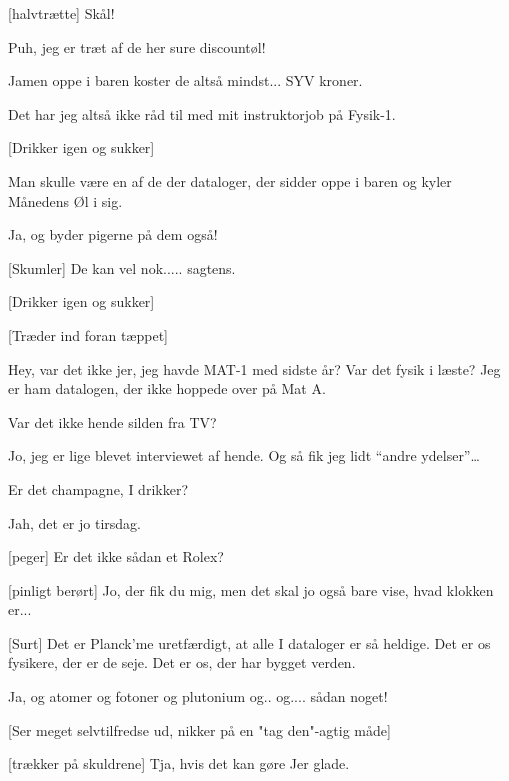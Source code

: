 \documentclass[a4paper,11pt]{article}
\begin{document}
\begin{sketch}
  
   [halvtrætte] Skål! 
  
   Puh, jeg er træt af de her sure discountøl!
  
   Jamen oppe i baren koster de altså mindst... SYV kroner.
  
   Det har jeg altså ikke råd til med mit instruktorjob på
  Fysik-1.
  
   [Drikker igen og sukker]
  
   Man skulle være en af de der dataloger, der sidder oppe i
  baren og kyler Månedens Øl i sig.
  
   Ja, og byder pigerne på dem også!
  
   [Skumler] De kan vel nok.....
  sagtens.
  
   [Drikker igen og sukker]

   [Træder ind foran tæppet]
  
   Hey, var det ikke jer, jeg havde MAT-1 med sidste år?
  Var det fysik i læste? Jeg er ham datalogen, der ikke hoppede over
  på Mat A.
  
  
   Var det ikke hende silden fra TV?
  
   Jo, jeg er lige blevet interviewet af hende. Og så fik
  jeg lidt ``andre ydelser''\ldots
  
   Er det champagne, I drikker?
  
   Jah, det er jo tirsdag.
  
   [peger] Er det ikke sådan et Rolex?
  
   [pinligt berørt] Jo, der fik du mig, men det skal jo også
  bare vise, hvad klokken er...
  
   [Surt] Det er Planck'me uretfærdigt, at alle I dataloger
  er så heldige. Det er os fysikere, der er de seje. Det er os, der
  har bygget verden.
  
   Ja, og atomer og fotoner og plutonium og.. og.... sådan
  noget!
  
   [Ser meget selvtilfredse ud, nikker på en "tag den"-agtig
  måde]
  
   [trækker på skuldrene] Tja, hvis det kan gøre Jer glade.
  

\end{sketch}
\end{document}
